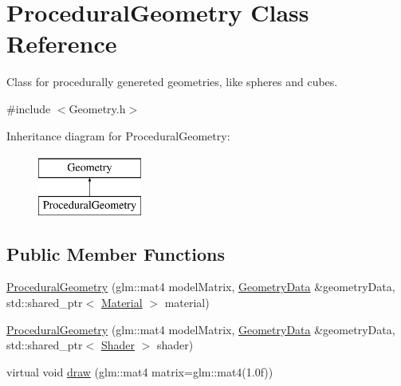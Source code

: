 \hypertarget{class_procedural_geometry}{}\section{Procedural\+Geometry Class Reference}
\label{class_procedural_geometry}


Class for procedurally genereted geometries, like spheres and cubes.  




{\ttfamily \#include $<$Geometry.\+h$>$}

Inheritance diagram for Procedural\+Geometry\+:\begin{figure}[H]
\begin{center}
\leavevmode
\includegraphics[height=2.000000cm]{class_procedural_geometry}
\end{center}
\end{figure}
\subsection*{Public Member Functions}
\begin{DoxyCompactItemize}
\item 
\mbox{\hyperlink{class_procedural_geometry_a30248690322b0e29f013e3e832338dd0}{Procedural\+Geometry}} (glm\+::mat4 model\+Matrix, \mbox{\hyperlink{struct_geometry_data}{Geometry\+Data}} \&geometry\+Data, std\+::shared\+\_\+ptr$<$ \mbox{\hyperlink{class_material}{Material}} $>$ material)
\item 
\mbox{\hyperlink{class_procedural_geometry_ada1bdbdd69542837089d339dd9c63564}{Procedural\+Geometry}} (glm\+::mat4 model\+Matrix, \mbox{\hyperlink{struct_geometry_data}{Geometry\+Data}} \&geometry\+Data, std\+::shared\+\_\+ptr$<$ \mbox{\hyperlink{class_shader}{Shader}} $>$ shader)
\item 
virtual void \mbox{\hyperlink{class_procedural_geometry_ab3c3e34093cb3af5756d214b18ff6047}{draw}} (glm\+::mat4 matrix=glm\+::mat4(1.\+0f))
\end{DoxyCompactItemize}
